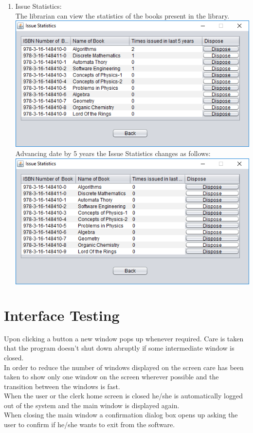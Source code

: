 \documentclass{article}
\begin{document}
\begin{enumerate}
	
	\item Issue Statistics:\\
	The librarian can view the statistics of the books present in the library.\\
	\includegraphics[scale=0.8]{images/LibrarianLogin/Actions/IssueStats/NormalIssueStats.PNG}\\
	Advancing date by 5 years the Issue Statistics changes as follows:\\
	\includegraphics[scale=0.8]{images/LibrarianLogin/Actions/IssueStats/IssueStatsAfter5years.PNG}	
\end{enumerate}


\section{Interface Testing}
Upon clicking a button a new window pops up whenever required. Care is taken that the program doesn’t shut down abruptly if some intermediate window is closed.\\
In order to reduce the number of windows displayed on the screen care has been taken to show only one window on the screen wherever possible and the transition between the windows is fast.\\
When the user or the clerk home screen is closed he/she is automatically logged out of the system and the main window is displayed again.\\
When closing the main window a confirmation dialog box opens up asking the user to confirm if he/she wants to exit from the software.\\
\end{document}

